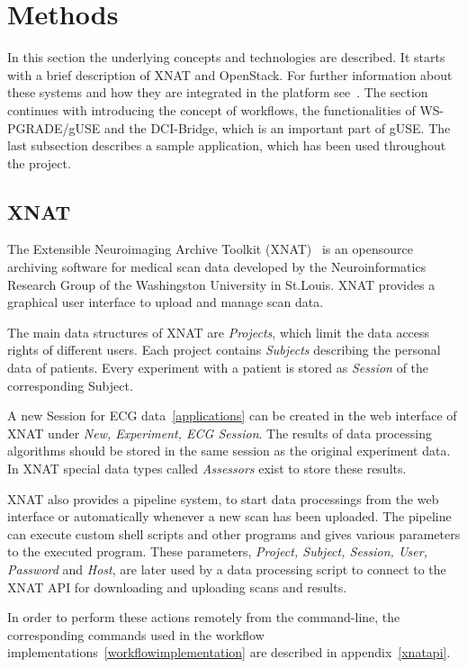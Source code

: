 \section{Methods}\label{methods}

In this section the underlying concepts and technologies are described. It starts with a brief description of XNAT and OpenStack. For further information about these systems and how they are integrated in the platform see~\cite{wu14}. The section continues with introducing the concept of workflows, the functionalities of WS-PGRADE/gUSE and the DCI-Bridge, which is an important part of gUSE. The last subsection describes a sample application, which has been used throughout the project.

\subsection{XNAT}\label{xnat}

The Extensible Neuroimaging Archive Toolkit (XNAT)~\cite{marcus_extensible_2007} is an opensource archiving software for medical scan data developed by the Neuroinformatics Research Group of the Washingston University in St.Louis.
XNAT provides a graphical user interface to upload and manage scan data.

The main data structures of XNAT are \textit{Projects}, which limit the data access rights of different users.
Each project contains \textit{Subjects} describing the personal data of patients.
Every experiment with a patient is stored as \textit{Session} of the corresponding Subject.

A new Session for ECG data~\ref{applications} can be created in the web interface of XNAT under \textit{New, Experiment, ECG Session}.
The results of data processing algorithms should be stored in the same session as the original experiment data.
In XNAT special data types called \textit{Assessors} exist to store these results.

XNAT also provides a pipeline system, to start data processings from the web interface or automatically whenever a new scan has been uploaded.
The pipeline can execute custom shell scripts and other programs and gives various parameters to the executed program.
These parameters, \textit{Project, Subject, Session, User, Password} and \textit{Host}, are later used by a data processing script to connect to the XNAT API for downloading and uploading scans and results.

In order to perform these actions remotely from the command-line, the corresponding commands used in the workflow implementations~\ref{workflowimplementation} are described in appendix~\ref{xnatapi}.

